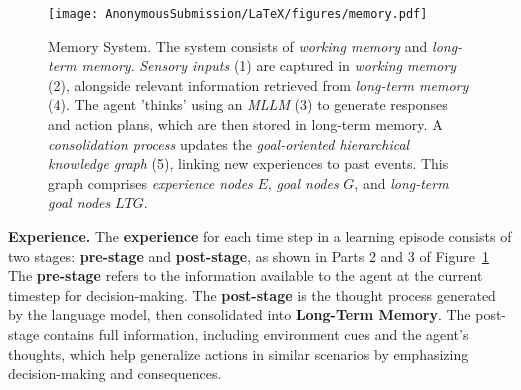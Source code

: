 \begin{figure}[h]
  \centering
  \texttt{[image: AnonymousSubmission/LaTeX/figures/memory.pdf]}
  \caption{Memory System. 
  The system consists of \textit{working memory} and \textit{long-term memory}. \textit{Sensory inputs} (1) are captured in \textit{working memory} (2), alongside relevant information retrieved from \textit{long-term memory} (4). The agent 'thinks' using an \textit{MLLM} (3) to generate responses and action plans, which are then stored in long-term memory. A \textit{consolidation process} updates the \textit{goal-oriented hierarchical knowledge graph} (5), linking new experiences to past events. This graph comprises \textit{experience nodes} $E$, \textit{goal nodes} $G$, and \textit{long-term goal nodes} $LTG$.}
  \label{fig:memory_system}
  \vspace{-0.1in}
\end{figure}
\textbf{Experience.} The \textbf{experience} for each time step in a learning episode consists of two stages: \textbf{pre-stage} and \textbf{post-stage}, as shown in Parts 2 and 3 of Figure~\ref{fig:memory_system} The \textbf{pre-stage} refers to the information available to the agent at the current timestep for decision-making. The \textbf{post-stage} is the thought process generated by the language model, then consolidated into \textbf{Long-Term Memory}. The post-stage contains full information, including environment cues and the agent's thoughts, which help generalize actions in similar scenarios by emphasizing decision-making and consequences.


